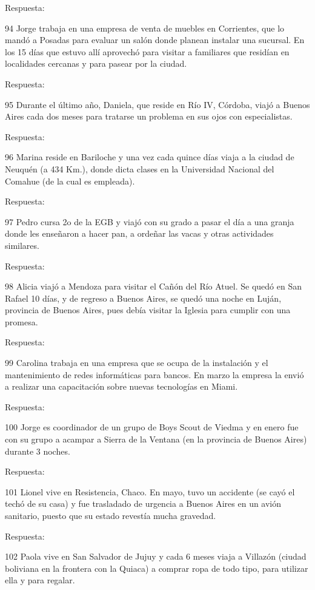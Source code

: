 \documentclass[
  openany]{book}
\begin{document}
Respuesta:

94 Jorge trabaja en una empresa de venta de muebles en Corrientes, que lo mandó a Posadas para evaluar un salón donde planean instalar una sucursal. En los 15 días que estuvo allí aprovechó para visitar a familiares que residían en localidades cercanas y para pasear por la ciudad.

Respuesta:

95 Durante el último año, Daniela, que reside en Río IV, Córdoba, viajó a Buenos Aires cada dos meses para tratarse un problema en sus ojos con especialistas.

Respuesta:

96 Marina reside en Bariloche y una vez cada quince días viaja a la ciudad de Neuquén (a 434 Km.), donde dicta clases en la Universidad Nacional del Comahue (de la cual es empleada).

Respuesta:

97 Pedro cursa 2o de la EGB y viajó con su grado a pasar el día a una granja donde les enseñaron a hacer pan, a ordeñar las vacas y otras actividades similares.

Respuesta:

98 Alicia viajó a Mendoza para visitar el Cañón del Río Atuel. Se quedó en San Rafael 10 días, y de regreso a Buenos Aires, se quedó una noche en Luján, provincia de Buenos Aires, pues debía visitar la Iglesia para cumplir con una promesa.

Respuesta:

99 Carolina trabaja en una empresa que se ocupa de la instalación y el mantenimiento de redes informáticas para bancos. En marzo la empresa la envió a realizar una capacitación sobre nuevas tecnologías en Miami.

Respuesta:

100 Jorge es coordinador de un grupo de Boys Scout de Viedma y en enero fue con su grupo a acampar a Sierra de la Ventana (en la provincia de Buenos Aires) durante 3 noches.

Respuesta:

101 Lionel vive en Resistencia, Chaco. En mayo, tuvo un accidente (se cayó el techó de su casa) y fue trasladado de urgencia a Buenos Aires en un avión sanitario, puesto que su estado revestía mucha gravedad.

Respuesta:

102 Paola vive en San Salvador de Jujuy y cada 6 meses viaja a Villazón (ciudad boliviana en la frontera con la Quiaca) a comprar ropa de todo tipo, para utilizar ella y para regalar.
\end{document}
